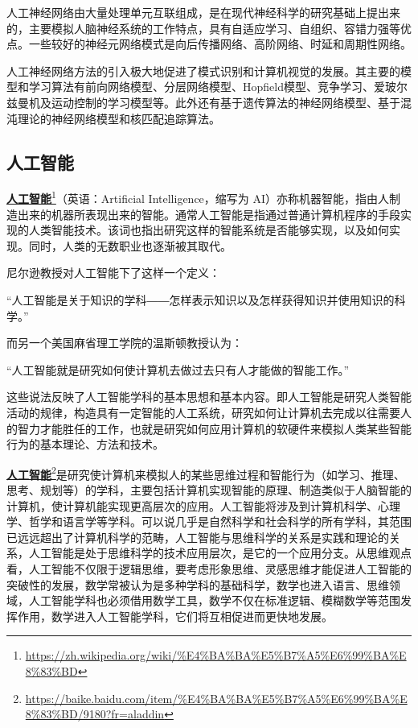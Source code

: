 {人工神经网络由大量处理单元互联组成，是在现代神经科学的研究基础上提出来的，主要模拟人脑神经系统的工作特点，具有自适应学习、自组织、容错力强等优点。一些较好的神经元网络模式是向后传播网络、高阶网络、时延和周期性网络。

人工神经网络方法\citep{.2016d}的引入极大地促进了模式识别和计算机视觉的发展。其主要的模型和学习算法有前向网络模型、分层网络模型、Hopfield模型、竞争学习、爱玻尔兹曼机及运动控制的学习模型等。此外还有基于遗传算法的神经网络模型、基于混沌理论的神经网络模型和核匹配追踪算法。

\subsection{人工智能}
\href{https://zh.wikipedia.org/wiki/\%E4\%BA\%BA\%E5\%B7\%A5\%E6\%99\%BA\%E8\%83\%BD}{\textbf{人工智能}}\footnote{\url{https://zh.wikipedia.org/wiki/\%E4\%BA\%BA\%E5\%B7\%A5\%E6\%99\%BA\%E8\%83\%BD}}（英语：Artificial Intelligence，缩写为 AI）亦称机器智能\citep{.2018i}，指由人制造出来的机器所表现出来的智能。通常人工智能是指通过普通计算机程序的手段实现的人类智能技术。该词也指出研究这样的智能系统是否能够实现，以及如何实现。同时，人类的无数职业也逐渐被其取代。

尼尔逊教授对人工智能下了这样一个定义：
\begin{myqt}
	“人工智能是关于知识的学科――怎样表示知识以及怎样获得知识并使用知识的科学。”
\end{myqt}

而另一个美国麻省理工学院的温斯顿教授认为：
\begin{myqt}
“人工智能就是研究如何使计算机去做过去只有人才能做的智能工作。”
\end{myqt}

这些说法反映了人工智能学科的基本思想和基本内容。即人工智能是研究人类智能活动的规律，构造具有一定智能的人工系统，研究如何让计算机去完成以往需要人的智力才能胜任的工作，也就是研究如何应用计算机的软硬件来模拟人类某些智能行为的基本理论、方法和技术。

\href{https://baike.baidu.com/item/\%E4\%BA\%BA\%E5\%B7\%A5\%E6\%99\%BA\%E8\%83\%BD/9180?fr=aladdin}{\textbf{人工智能}}\footnote{\url{https://baike.baidu.com/item/\%E4\%BA\%BA\%E5\%B7\%A5\%E6\%99\%BA\%E8\%83\%BD/9180?fr=aladdin}}是研究使计算机来模拟人的某些思维过程和智能行为（如学习、推理、思考、规划等）的学科，主要包括计算机实现智能的原理、制造类似于人脑智能的计算机，使计算机能实现更高层次的应用。人工智能将涉及到计算机科学、心理学、哲学和语言学等学科。可以说几乎是自然科学和社会科学的所有学科，其范围已远远超出了计算机科学的范畴，人工智能与思维科学的关系是实践和理论的关系，人工智能是处于思维科学的技术应用层次，是它的一个应用分支。从思维观点看，人工智能不仅限于逻辑思维，要考虑形象思维、灵感思维才能促进人工智能的突破性的发展，数学常被认为是多种学科的基础科学，数学也进入语言、思维领域，人工智能学科也必须借用数学工具，数学不仅在标准逻辑、模糊数学等范围发挥作用，数学进入人工智能学科，它们将互相促进而更快地发展。

}
